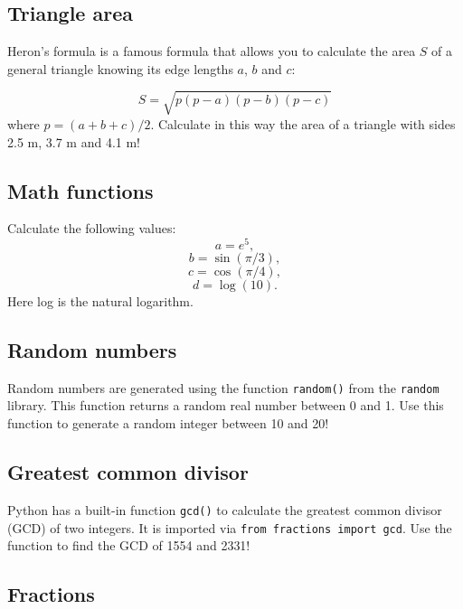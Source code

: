 \subsection{Triangle area}

Heron's formula is a famous formula that allows you to calculate the area $S$ of a 
general triangle knowing its edge lengths $a$, $b$ and $c$:

$$
S = \sqrt{p(p-a)(p-b)(p-c)}
$$
where $p = (a + b + c)/2$. Calculate in this way the area of a triangle with sides 
2.5 m, 3.7 m and 4.1 m!


\subsection{Math functions}

Calculate the following values:
$$
a = e^5,
$$
$$
b = \sin(\pi/3),
$$
$$
c = \cos(\pi/4),
$$
$$
d = \log(10).
$$
Here log is the natural logarithm.


\subsection{Random numbers}

Random numbers are generated using the function {\tt random()} from the {\tt random}
library. This function returns a random real number between 0 and 1. 
Use this function to generate a random integer between 
10 and 20!


\subsection{Greatest common divisor}

Python has a built-in function {\tt gcd()} to calculate the greatest common divisor (GCD)
of two integers. It is imported via {\tt from fractions import gcd}. Use 
the function to find the GCD of 1554 and 2331!


\subsection{Fractions}

